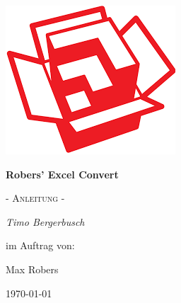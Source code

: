 \begin{titlepage}
	\centering
	\includegraphics{pics/sketchup-icon}\par\vspace{1cm}
	
	\vspace{1.5cm}
	{\huge\bfseries Robers' Excel Convert\par}
	\vspace{1cm}
	{\scshape\Large - Anleitung -\par}
	\vspace{2cm}
	{\Large\itshape Timo Bergerbusch\par}
	\vfill
	im Auftrag von:\par
	Max Robers
	
	\vfill
	
	{\large \germanDate\today\par}
\end{titlepage}